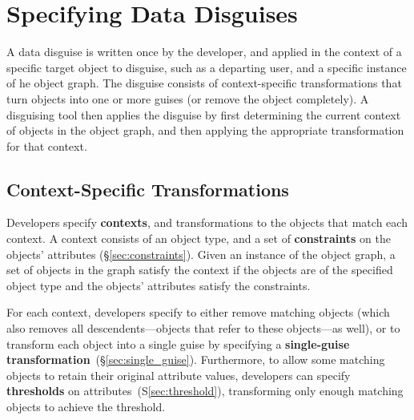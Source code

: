\section{Specifying Data Disguises}
\label{sec:policies}

A data disguise is written once by the developer, and applied in the context of a specific target
object to disguise, such as a departing user, and a specific instance of he object graph.
%
The disguise consists of context-specific transformations that turn objects into one or
more guises (or remove the object completely). 
%
A disguising tool then applies the disguise by first determining the current context of objects in the object
graph, and then applying the appropriate transformation for that context.

\subsection{Context-Specific Transformations}
\label{sec:context}

Developers specify \textbf{contexts}, and transformations to the objects that match each context. 
%
%
%
A context consists of an object type, and a set of \textbf{constraints} on the objects' attributes
(\S\ref{sec:constraints}).
Given an instance of the object graph, a set of objects in the graph
satisfy the context if the objects are of the specified object type and the objects'
attributes satisfy the constraints.

For each context, developers specify to either remove matching objects (which also removes all
descendents---objects that refer to these objects---as well), or to transform each object into
a single guise by specifying a \textbf{single-guise transformation}~(\S\ref{sec:single_guise}). 
Furthermore, to allow some matching objects to retain their original attribute values, 
developers can specify \textbf{thresholds} on attributes~(S\ref{sec:threshold}), transforming
only enough matching objects to achieve the threshold.

